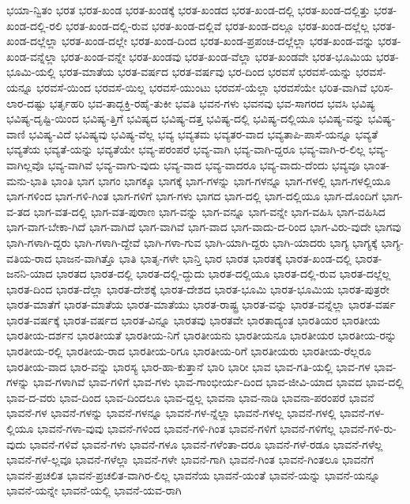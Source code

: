 {ಭಯಾ-ನ್ವಿತಂ
ಭರತ
ಭರತ-ಖಂಡ
ಭರತ-ಖಂಡಕ್ಕೆ
ಭರತ-ಖಂಡದ
ಭರತ-ಖಂಡ-ದಲ್ಲಿ
ಭರತ-ಖಂಡ-ದಲ್ಲಿತ್ತು
ಭರತ-ಖಂಡ-ದಲ್ಲಿ-ರಲಿ
ಭರತ-ಖಂಡ-ದಲ್ಲಿ-ರುವ
ಭರತ-ಖಂಡ-ದಲ್ಲಿವೆ
ಭರತ-ಖಂಡ-ದಲ್ಲೂ
ಭರತ-ಖಂಡ-ದಲ್ಲೆಲ್ಲ
ಭರತ-ಖಂಡ-ದಲ್ಲೆಲ್ಲಾ
ಭರತ-ಖಂಡ-ದಲ್ಲೇ
ಭರತ-ಖಂಡ-ದಿಂದ
ಭರತ-ಖಂಡ-ಪ್ರಪಂಚ-ದಲ್ಲೆಲ್ಲಾ
ಭರತ-ಖಂಡ-ವನ್ನು
ಭರತ-ಖಂಡ-ವನ್ನೆಲ್ಲಾ
ಭರತ-ಖಂಡ-ವನ್ನೇ
ಭರತ-ಖಂಡವು
ಭರತ-ಖಂಡ-ವೆಲ್ಲಾ
ಭರತ-ಖಂಡವೇ
ಭರತ-ಭೂಮಿಯ
ಭರತ-ಭೂಮಿ-ಯಲ್ಲಿ
ಭರತ-ಮಾತೆಯ
ಭರತ-ವರ್ಷದ
ಭರತ-ವರ್ಷವು
ಭರ-ದಿಂದ
ಭರವಸೆ
ಭರವಸೆ-ಯನ್ನು
ಭರವಸೆ-ಯನ್ನೂ
ಭರವಸೆ-ಯಿಂದ
ಭರವಸೆ-ಯಿಲ್ಲ
ಭರವಸೆ-ಯುಂಟು
ಭರವಸೆ-ಯೆಲ್ಲಾ
ಭರವಸೆಯೇ
ಭರಿತ-ವಾಗಿವೆ
ಭರಿಸ-ಲಾರ-ದಷ್ಟು
ಭರ್ತೃಹರಿ
ಭವ-ತಾದ್ಭಕ್ತಿ-ರಹೈ-ತುಕೀ
ಭವತಿ
ಭವನ-ಗಳು
ಭವನವು
ಭವ-ಸಾಗರದ
ಭವಸಿ
ಭವಿಷ್ಯ
ಭವಿಷ್ಯ-ದೃಷ್ಟಿ-ಯಿಂದ
ಭವಿಷ್ಯ-ತ್ತಿಗೆ
ಭವಿಷ್ಯದ
ಭವಿಷ್ಯ-ದತ್ತ
ಭವಿಷ್ಯ-ದಲ್ಲಿ
ಭವಿಷ್ಯ-ದಲ್ಲಿಯೂ
ಭವಿಷ್ಯ-ವನ್ನು
ಭವಿಷ್ಯ-ವಾಣಿ
ಭವಿಷ್ಯ-ವಿದೆ
ಭವಿಷ್ಯವು
ಭವಿಷ್ಯ-ವೆಲ್ಲ
ಭವ್ಯ
ಭವ್ಯತಮ
ಭವ್ಯತರ-ವಾದ
ಭವ್ಯತಾಪಿ-ಪಾಸೆ-ಯನ್ನೂ
ಭವ್ಯತೆ
ಭವ್ಯತೆಯ
ಭವ್ಯತೆ-ಯನ್ನು
ಭವ್ಯತೆಯೇ
ಭವ್ಯ-ಪರಂಪರೆ
ಭವ್ಯ-ವಾಗಿ
ಭವ್ಯ-ವಾಗಿ-ದ್ದರೂ
ಭವ್ಯ-ವಾಗಿ-ರ-ಲಿಲ್ಲ
ಭವ್ಯ-ವಾಗಿಲ್ಲವೊ
ಭವ್ಯ-ವಾಗಿವೆ
ಭವ್ಯ-ವಾಗು-ವುದು
ಭವ್ಯ-ವಾದ
ಭವ್ಯ-ವಾದರೂ
ಭವ್ಯ-ವಾದು-ದೆಂದು
ಭವ್ಯವೂ
ಭಾಂತ-ಮನು-ಭಾತಿ
ಭಾಂತಿ
ಭಾಗ
ಭಾಗಂ
ಭಾಗಕ್ಕೂ
ಭಾಗಕ್ಕೆ
ಭಾಗ-ಗಳನ್ನು
ಭಾಗ-ಗಳನ್ನೂ
ಭಾಗ-ಗಳಲ್ಲಿ
ಭಾಗ-ಗಳಲ್ಲಿಯೂ
ಭಾಗ-ಗಳಿಂದ
ಭಾಗ-ಗಳಿ-ಗಿಂತ
ಭಾಗ-ಗಳಿಗೆ
ಭಾಗ-ಗಳು
ಭಾಗದ
ಭಾಗ-ದಲ್ಲಿ
ಭಾಗ-ದಲ್ಲಿಯೂ
ಭಾಗ-ದೊಂದಿಗೆ
ಭಾಗ-ವ-ತದ
ಭಾಗ-ವತ-ದಲ್ಲಿ
ಭಾಗ-ವತ-ಪುರಾಣ
ಭಾಗ-ವನ್ನು
ಭಾಗ-ವನ್ನೂ
ಭಾಗ-ವನ್ನೇ
ಭಾಗ-ವಹಿಸಿ
ಭಾಗ-ವಹಿಸಿದ
ಭಾಗ-ವಾಗ-ಬೇಕಾ-ಗಿದೆ
ಭಾಗ-ವಾಗಿದೆ
ಭಾಗ-ವಾಗಿವೆ
ಭಾಗ-ವಾದ
ಭಾಗ-ವಾದು-ದ-ರಿಂದ
ಭಾಗ-ವಿರು-ವುದೇ
ಭಾಗವು
ಭಾಗಿ-ಗಳಾಗಿ-ದ್ದರು
ಭಾಗಿ-ಗಳಾಗಿ-ದ್ದೇವೆ
ಭಾಗಿ-ಗಳಾ-ಗುವ
ಭಾಗಿ-ಯಾಗಿ-ದ್ದರು
ಭಾಗಿ-ಯಾದರು
ಭಾಗ್ಯ
ಭಾಗ್ಯಕ್ಕೆ
ಭಾಗ್ಯ-ವತಿಯ-ರಾದ
ಭಾಜನ-ವಾಗಿತ್ತೊ
ಭಾತಿ
ಭಾತೃ-ಗಳೇ
ಭಾನ್ತಿ
ಭಾರ
ಭಾರತ
ಭಾರತಕ್ಕೆ
ಭಾರತ-ಖಂಡ-ದಲ್ಲಿ
ಭಾರತ-ಜನನಿ-ಯಾದ
ಭಾರತದ
ಭಾರತ-ದಲ್ಲಿ
ಭಾರತ-ದಲ್ಲಿ-ದ್ದುದು
ಭಾರತ-ದಲ್ಲಿಯೂ
ಭಾರತ-ದಲ್ಲಿ-ರುವ
ಭಾರತ-ದಲ್ಲೆಲ್ಲ
ಭಾರತ-ದಿಂದ
ಭಾರತ-ದೆಲ್ಲಾ
ಭಾರತ-ದೇಶಕ್ಕೆ
ಭಾರತ-ದೇಶದ
ಭಾರತ-ಭೂಮಿ
ಭಾರತ-ಭೂಮಿಯ
ಭಾರತ-ಪುತ್ರರೇ
ಭಾರತ-ಮಾತೆಗೆ
ಭಾರತ-ಮಾತೆಯ
ಭಾರತ-ಮಾತೆಯು
ಭಾರತ-ರಾಷ್ಟ್ರ
ಭಾರತ-ವನ್ನು
ಭಾರತ-ವನ್ನೆಲ್ಲಾ
ಭಾರತ-ವರ್ಷ
ಭಾರತ-ವರ್ಷಕ್ಕೆ
ಭಾರತ-ವರ್ಷದ
ಭಾರತ-ವಿನ್ನೂ
ಭಾರತವು
ಭಾರತವೇ
ಭಾರತಾದ್ಯಂತ
ಭಾರತಿಯರ
ಭಾರತೀಯ
ಭಾರತೀಯ-ದರ್ಶನ
ಭಾರತೀಯತೆ
ಭಾರತೀಯ-ನಿಗೆ
ಭಾರತೀಯನು
ಭಾರತೀಯನೂ
ಭಾರತೀಯರ
ಭಾರತೀಯ-ರನ್ನು
ಭಾರತೀಯ-ರಲ್ಲಿ
ಭಾರತೀಯ-ರಾದ
ಭಾರತೀಯ-ರಿಗೂ
ಭಾರತೀಯ-ರಿಗೆ
ಭಾರತೀಯರು
ಭಾರತೀಯ-ರೆಲ್ಲರೂ
ಭಾರತೀಯ-ವಾದ
ಭಾರ-ವನ್ನು
ಭಾರಸ್ಯ
ಭಾರ-ಹಾ-ಕುತ್ತಾನೆ
ಭಾರಿ
ಭಾರೀ
ಭಾವ
ಭಾವ-ಗತಿ-ಯಲ್ಲಿ
ಭಾವ-ಗಳ
ಭಾವ-ಗಳನ್ನು
ಭಾವ-ಗಳಾಗಿವೆ
ಭಾವ-ಗಳಿಗೆ
ಭಾವ-ಗಳು
ಭಾವ-ಗಾಂಭೀರ್ಯ-ದಿಂದ
ಭಾವ-ಜೀವಿ-ಯಾದ
ಭಾವದ
ಭಾವ-ದಲ್ಲಿ
ಭಾವ-ದ-ವರು
ಭಾವ-ದಿಂದ
ಭಾವ-ದಿಂದಲೂ
ಭಾವ-ದ್ದಲ್ಲ
ಭಾವನಾ
ಭಾವ-ನಾಡಿ
ಭಾವನಾ-ಪರಂಪರೆ
ಭಾವನೆ
ಭಾವನೆ-ಗಳ
ಭಾವನೆ-ಗಳನ್ನು
ಭಾವನೆ-ಗಳನ್ನೂ
ಭಾವನೆ-ಗಳ-ನ್ನೆಲ್ಲಾ
ಭಾವನೆ-ಗಳಲ್ಲ
ಭಾವನೆ-ಗಳಲ್ಲಿ
ಭಾವನೆ-ಗಳ-ಲ್ಲಿಯೂ
ಭಾವನೆ-ಗಳಾ-ವುವು
ಭಾವನೆ-ಗಳಿಂದ
ಭಾವನೆ-ಗಳಿ-ಗಿಂತ
ಭಾವನೆ-ಗಳಿಗೆ
ಭಾವನೆ-ಗಳಿಗೆಲ್ಲ
ಭಾವನೆ-ಗಳಿ-ರು-ವುದು
ಭಾವನೆ-ಗಳಿವೆ
ಭಾವನೆ-ಗಳು
ಭಾವನೆ-ಗಳೂ
ಭಾವನೆ-ಗಳೆಂತಾ-ದರೂ
ಭಾವನೆ-ಗಳೆ-ರಡೂ
ಭಾವನೆ-ಗಳೆಲ್ಲ
ಭಾವನೆ-ಗಳೆ-ಲ್ಲವೂ
ಭಾವನೆ-ಗಳೆಲ್ಲಾ
ಭಾವನೆ-ಗಳೇ
ಭಾವನೆ-ಗಾಗಿ
ಭಾವನೆ-ಗಿಂತ
ಭಾವನೆ-ಗಿಂತಲೂ
ಭಾವನೆಗೆ
ಭಾವನೆ-ಪ್ರಚಲಿತ
ಭಾವನೆ-ಪ್ರಚಲಿತ-ವಾಗಿರ-ಲಿಲ್ಲ
ಭಾವನೆಯ
ಭಾವನೆ-ಯಂತೆ
ಭಾವನೆ-ಯನ್ನು
ಭಾವನೆ-ಯನ್ನೂ
ಭಾವನೆ-ಯನ್ನೇ
ಭಾವನೆ-ಯಲ್ಲಿ
ಭಾವನೆ-ಯವ-ರಾಗಿ
}
